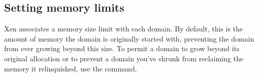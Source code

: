 \subsection{Setting memory limits}

Xen associates a memory size limit with each domain.  By default, this
is the amount of memory the domain is originally started with,
preventing the domain from ever growing beyond this size.  To permit a
domain to grow beyond its original allocation or to prevent a domain
you've shrunk from reclaiming the memory it relinquished, use the
 command.
